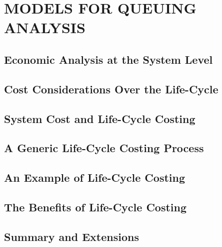 \chapter{MODELS FOR QUEUING ANALYSIS}\label{chap:14}

\section{Economic Analysis at the System Level}


\section{Cost Considerations Over the Life-Cycle}


\section{System Cost and Life-Cycle Costing}


\section{A Generic Life-Cycle Costing Process}


\section{An Example of Life-Cycle Costing}


\section{The Benefits of Life-Cycle Costing}


\section{Summary and Extensions}

